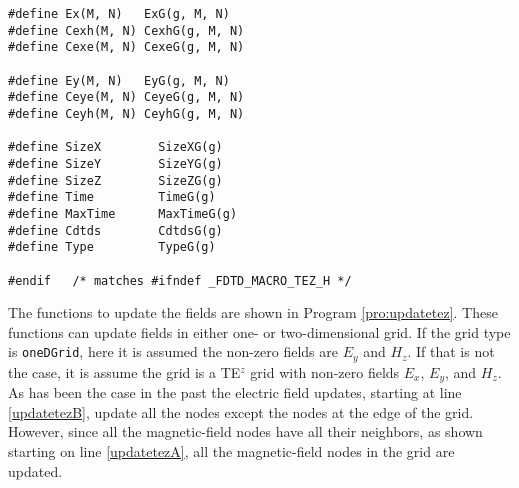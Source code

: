 \begin{program}
\begin{lstlisting}
#define Ex(M, N)   ExG(g, M, N)
#define Cexh(M, N) CexhG(g, M, N)
#define Cexe(M, N) CexeG(g, M, N)

#define Ey(M, N)   EyG(g, M, N)
#define Ceye(M, N) CeyeG(g, M, N) 
#define Ceyh(M, N) CeyhG(g, M, N) 

#define SizeX        SizeXG(g)
#define SizeY        SizeYG(g)
#define SizeZ        SizeZG(g)
#define Time         TimeG(g)
#define MaxTime      MaxTimeG(g)
#define Cdtds        CdtdsG(g)
#define Type         TypeG(g)

#endif   /* matches #ifndef _FDTD_MACRO_TEZ_H */
\end{lstlisting}
\end{program}

The functions to update the fields are shown in Program
\ref{pro:updatetez}.  These functions can update fields in either one-
or two-dimensional grid.  If the grid type is {\tt oneDGrid}, here it
is assumed the non-zero fields are $E_y$ and $H_z$.  If that is not
the case, it is assume the grid is a TE$^z$ grid with non-zero fields
$E_x$, $E_y$, and $H_z$.  As has been the case in the past the
electric field updates, starting at line \ref{updatetezB}, update all
the nodes except the nodes at the edge of the grid.  However, since
all the magnetic-field nodes have all their neighbors, as shown
starting on line \ref{updatetezA}, all the magnetic-field nodes in the
grid are updated.

